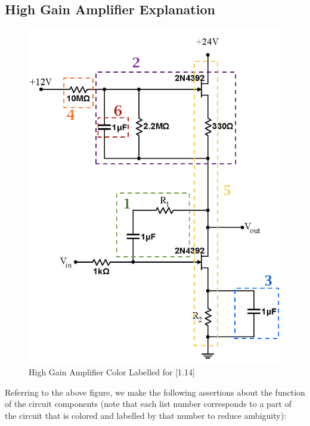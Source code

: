 \documentclass{article}
\begin{document}
\subsection{High Gain Amplifier Explanation}
    \begin{figure}[H]
        \centering
        \includegraphics[scale = 0.7]{5_14.png}
        \caption{High Gain Amplifier Color Labelled for [1.14]~\cite{webfig}}
        \label{fig:my_label}
    \end{figure}
    Referring to the above figure, we make the following assertions about the function of the circuit components (note that each list number corresponds to a part of the circuit that is colored and labelled by that number to reduce ambiguity):
\end{document}
